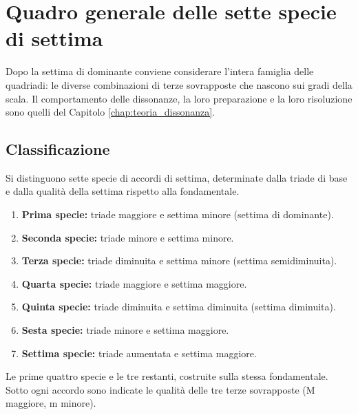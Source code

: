\chapter{Quadro generale delle sette specie di settima}
\label{chap:sette_specie}

Dopo la settima di dominante conviene considerare l'intera famiglia delle quadriadi: le diverse combinazioni di terze sovrapposte che nascono sui gradi della scala. Il comportamento delle dissonanze, la loro preparazione e la loro risoluzione sono quelli del Capitolo \ref{chap:teoria_dissonanza}.

\section{Classificazione}
\label{sec:classificazione_specie}

Si distinguono sette specie di accordi di settima, determinate dalla triade di base e dalla qualità della settima rispetto alla fondamentale.

\begin{enumerate}
    \item \textbf{Prima specie:} triade maggiore e settima minore (settima di dominante).
    \item \textbf{Seconda specie:} triade minore e settima minore.
    \item \textbf{Terza specie:} triade diminuita e settima minore (settima semidiminuita).
    \item \textbf{Quarta specie:} triade maggiore e settima maggiore.
    \item \textbf{Quinta specie:} triade diminuita e settima diminuita (settima diminuita).
    \item \textbf{Sesta specie:} triade minore e settima maggiore.
    \item \textbf{Settima specie:} triade aumentata e settima maggiore.
\end{enumerate}

\begin{esempio}
	\label{ex:sette_specie}
	Le prime quattro specie e le tre restanti, costruite sulla stessa fondamentale. Sotto ogni accordo sono indicate le qualità delle tre terze sovrapposte (M maggiore, m minore).
\end{esempio}

